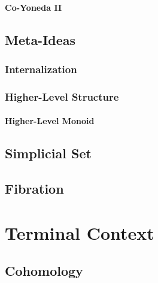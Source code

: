 \documentclass[a4paper,11pt,psamsfonts,reqno]{amsbook}
\newcounter{prpcounter}
\theoremstyle{proposition}
\theoremstyle{proof}
\begin{document}
\subsubsection{Co-Yoneda II}
\label{sec:coyoneda2}


%


\section{Meta-Ideas}
\label{sec:metaidea}


\subsection{Internalization}
\label{sec:internaliz}


\subsection{Higher-Level Structure}
\label{sec:hls}

\subsubsection{Higher-Level Monoid}
\label{sec:hlm}



\section{Simplicial Set}
\label{sec:sset}



\section{Fibration}
\label{sec:fibration}




\chapter{Terminal Context}
\label{chap:termcontext}



\section{Cohomology}
\label{sec:cohomology}

\end{document}
